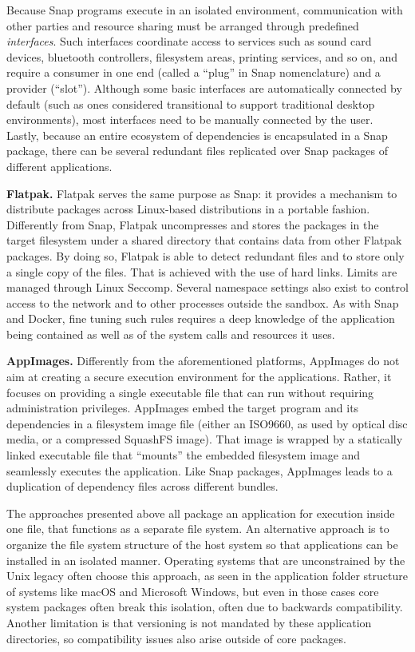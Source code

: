 \documentclass[sigplan, anonymous, 10pt]{acmart}
\begin{document}
Because Snap programs execute in an isolated environment, communication with other parties
and resource sharing must be arranged through predefined \emph{interfaces}. Such interfaces
coordinate access to services such as sound card devices, bluetooth controllers, filesystem
areas, printing services, and so on, and require a consumer in one end (called a ``plug''
in Snap nomenclature) and a provider (``slot''). Although some basic interfaces are automatically
connected by default (such as ones considered transitional to support traditional desktop
environments), most interfaces need to be manually connected by the user. Lastly, because
an entire ecosystem of dependencies is encapsulated in a Snap package, there can be several
redundant files replicated over Snap packages of different applications.

\textbf{Flatpak.}
Flatpak serves the same purpose as Snap: it provides a mechanism to distribute packages
across Linux-based distributions in a portable fashion. Differently from Snap, Flatpak
uncompresses and stores the packages in the target filesystem under a shared directory
that contains data from other Flatpak packages. By doing so, Flatpak is able to detect
redundant files and to store only a single copy of the files. That is achieved with the
use of hard links. Limits are managed through Linux Seccomp.
Several namespace settings also exist to control access to the network and to other
processes outside the sandbox. As with Snap and Docker, fine tuning such rules requires a deep
knowledge of the application being contained as well as of the system calls and resources
it uses.

\textbf{AppImages.}
Differently from the aforementioned platforms, AppImages do not aim at creating a
secure execution environment for the applications. Rather, it focuses on providing
a single executable file that can run without requiring administration privileges.
AppImages embed the target program and its dependencies in a filesystem image file
(either an ISO9660, as used by optical disc media, or a compressed SquashFS image).
That image is wrapped by a statically linked executable file that ``mounts'' the
embedded filesystem image and seamlessly executes the application. Like Snap
packages, AppImages leads to a duplication of dependency files across different
bundles.

The approaches presented above all package an application for execution inside one file,
that functions as a separate file system. An alternative approach is to organize the
file system structure of the host system so that applications can be installed in an
isolated manner. Operating systems that are unconstrained by the Unix legacy often
choose this approach, as seen in the application folder structure of systems like
macOS and Microsoft Windows, but even in those cases core system packages often
break this isolation, often due to backwards compatibility. Another limitation is that
versioning is not mandated by these application directories, so compatibility issues
also arise outside of core packages.
\end{document}
